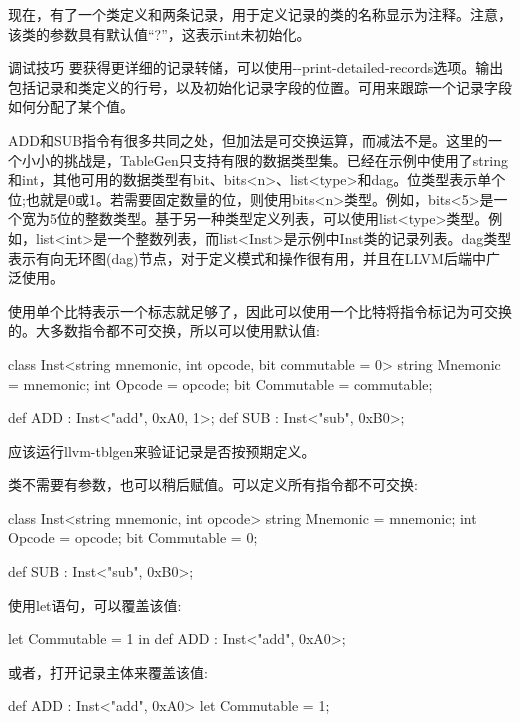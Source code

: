 现在，有了一个类定义和两条记录，用于定义记录的类的名称显示为注释。注意，该类的参数具有默认值“?”，这表示int未初始化。

\begin{myTip}{调试技巧}
要获得更详细的记录转储，可以使用-{}-print-detailed-records选项。输出包括记录和类定义的行号，以及初始化记录字段的位置。可用来跟踪一个记录字段如何分配了某个值。
\end{myTip}

ADD和SUB指令有很多共同之处，但加法是可交换运算，而减法不是。这里的一个小小的挑战是，TableGen只支持有限的数据类型集。已经在示例中使用了string和int，其他可用的数据类型有bit、bits<n>、list<type>和dag。位类型表示单个位;也就是0或1。若需要固定数量的位，则使用bits<n>类型。例如，bits<5>是一个宽为5位的整数类型。基于另一种类型定义列表，可以使用list<type>类型。例如，list<int>是一个整数列表，而list<Inst>是示例中Inst类的记录列表。dag类型表示有向无环图(dag)节点，对于定义模式和操作很有用，并且在LLVM后端中广泛使用。

使用单个比特表示一个标志就足够了，因此可以使用一个比特将指令标记为可交换的。大多数指令都不可交换，所以可以使用默认值:

\begin{shell}
class Inst<string mnemonic, int opcode, bit commutable = 0> {
    string Mnemonic = mnemonic;
    int Opcode = opcode;
    bit Commutable = commutable;
}

def ADD : Inst<"add", 0xA0, 1>;
def SUB : Inst<"sub", 0xB0>;
\end{shell}

应该运行llvm-tblgen来验证记录是否按预期定义。

类不需要有参数，也可以稍后赋值。可以定义所有指令都不可交换:

\begin{shell}
class Inst<string mnemonic, int opcode> {
    string Mnemonic = mnemonic;
    int Opcode = opcode;
    bit Commutable = 0;
}

def SUB : Inst<"sub", 0xB0>;
\end{shell}

使用let语句，可以覆盖该值:

\begin{shell}
let Commutable = 1 in
    def ADD : Inst<"add", 0xA0>;
\end{shell}

或者，打开记录主体来覆盖该值:

\begin{shell}
def ADD : Inst<"add", 0xA0> {
    let Commutable = 1;
}
\end{shell}

